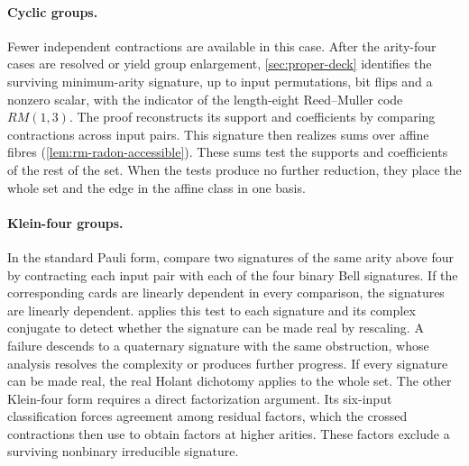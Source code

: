 \documentclass[11pt,letterpaper,onecolumn]{article}
\theoremstyle{plain}
\theoremstyle{definition}
\theoremstyle{remark}
\begin{document}
\paragraph{Cyclic groups.}
Fewer independent contractions are available in this case.
After the arity-four cases are resolved or yield group enlargement,
\cref{sec:proper-deck} identifies the surviving minimum-arity signature,
up to input permutations, bit flips and a nonzero scalar, with the
indicator of the length-eight Reed--Muller code \(RM(1,3)\). The proof
reconstructs its support and coefficients by comparing contractions across
input pairs. This signature then realizes sums over affine fibres
(\cref{lem:rm-radon-accessible}).  These sums test the supports and
coefficients of the rest of the set.  When the tests produce no
further reduction, they place the whole set and the edge in the
affine class in one basis.

\paragraph{Klein-four groups.}
In the standard Pauli form, compare two signatures of the same arity
above four by contracting each input pair with each of the four binary
Bell signatures. If the corresponding cards are linearly dependent in
every comparison, the signatures are linearly dependent. 
applies this test to each signature and its complex conjugate to detect
whether the signature can be made real by rescaling. A failure descends to a quaternary signature with the
same obstruction, whose analysis resolves the complexity or produces
further progress.  If every signature can be made real, the real
Holant dichotomy applies to the whole set.  The other Klein-four
form requires a direct factorization argument.  Its six-input
classification forces agreement among residual factors, which the
crossed contractions then use to obtain factors at higher arities.
These factors exclude a surviving nonbinary irreducible signature.
\end{document}
